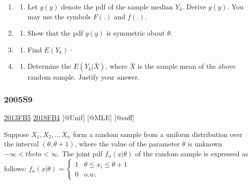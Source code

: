 \documentclass[6pt,Portrait]{article}
\providecommand{\tightlist}{%
  \setlength{\itemsep}{0pt}\setlength{\parskip}{0pt}}
\begin{document}
\begin{enumerate}
\def\labelenumi{(\alph{enumi})}
\item
  \begin{enumerate}
  \def\labelenumii{(\arabic{enumii})}
  \setcounter{enumii}{4}
  \tightlist
  \item
    Let \(g(y)\) denote the pdf of the sample median \(Y_k\). Derive
    \(g(y)\). You may use the symbols \(F(.)\) and \(f(.)\).
  \end{enumerate}
\item
  \begin{enumerate}
  \def\labelenumii{(\arabic{enumii})}
  \setcounter{enumii}{2}
  \tightlist
  \item
    Show that the pdf \(g(y)\) is symmetric about \(\theta\).
  \end{enumerate}
\item
  \begin{enumerate}
  \def\labelenumii{(\arabic{enumii})}
  \setcounter{enumii}{1}
  \tightlist
  \item
    Find \(E(Y_k)\)·
  \end{enumerate}
\item
  \begin{enumerate}
  \def\labelenumii{(\arabic{enumii})}
  \setcounter{enumii}{4}
  \tightlist
  \item
    Determine the \(E(Y_k|\bar X)\), where \(\bar X\) is the sample mean
    of the above random sample. Justify your answer.
  \end{enumerate}
\end{enumerate}

\hypertarget{s9-1}{%
\subsubsection{2005S9}\label{s9-1}}

\protect\hyperlink{fb5}{2013FB5} \protect\hyperlink{fb4-4}{2018FB4}
{[}@Unif{]} {[}@MLE{]} {[}@suff{]}

Suppose \(X_1,X_2,..,X_n\) form a random sample from a uniform
distribution over the interval \((\theta,\theta+1)\), where the value of
the parameter \(\theta\) is unknown \(-\infty<theta<\infty\). The joint
pdf \(f_n(\underline{x}|\theta)\) of the random sample is expressed as
follows:
\(f_n(\underline{x}|\theta)=\begin{cases}1&\theta\le x_i\le\theta+1\\0& o.w.\end{cases}\)
\end{document}
